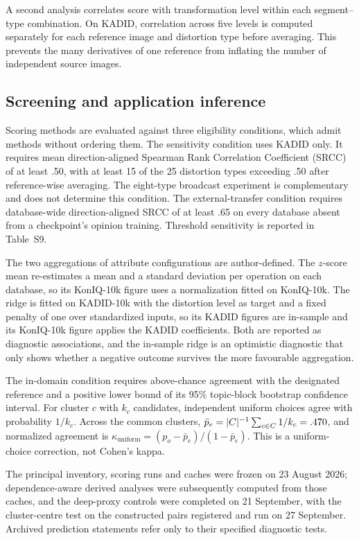 A second analysis correlates score with transformation level within each segment--type combination. On KADID, correlation across five levels is computed separately for each reference image and distortion type before averaging. This prevents the many derivatives of one reference from inflating the number of independent source images. 

\subsection{Screening and application inference}\label{sec:screen}

Scoring methods are evaluated against three eligibility conditions, which admit methods without ordering them. The sensitivity condition uses KADID only. It requires mean direction-aligned Spearman Rank Correlation Coefficient (SRCC) of at least .50, with at least 15 of the 25 distortion types exceeding .50 after reference-wise averaging. The eight-type broadcast experiment is complementary and does not determine this condition. The external-transfer condition requires database-wide direction-aligned SRCC of at least .65 on every database absent from a checkpoint's opinion training. Threshold sensitivity is reported in Table~S9.

The two aggregations of attribute configurations are author-defined. The $z$-score mean re-estimates a mean and a standard deviation per operation on each database, so its KonIQ-10k figure uses a normalization fitted on KonIQ-10k. The ridge is fitted on KADID-10k with the distortion level as target and a fixed penalty of one over standardized inputs, so its KADID figures are in-sample and its KonIQ-10k figure applies the KADID coefficients. Both are reported as diagnostic associations, and the in-sample ridge is an optimistic diagnostic that only shows whether a negative outcome survives the more favourable aggregation.

The in-domain condition requires above-chance agreement with the designated reference and a positive lower bound of its 95\% topic-block bootstrap confidence interval. For cluster $c$ with $k_c$ candidates, independent uniform choices agree with probability $1/k_c$. Across the common \disClusters{} clusters, $\bar p_e=|C|^{-1}\sum_{c\in C}1/k_c=.470{}$, and normalized agreement is $\kappa_{\mathrm{uniform}}=(p_o-\bar p_e)/(1-\bar p_e)$. This is a uniform-choice correction, not Cohen's kappa.

 

The principal inventory, scoring runs and caches were frozen on 23 August 2026; dependence-aware derived analyses were subsequently computed from those caches, and the deep-proxy controls were completed on 21 September, with the cluster-centre test on the constructed pairs registered and run on 27 September. Archived prediction statements refer only to their specified diagnostic tests.

